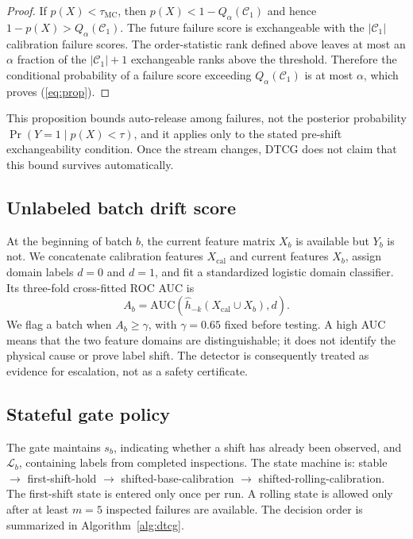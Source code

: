 \documentclass[journal]{IEEEtran}
\begin{document}
\begin{proof}
If $p(X)<\tau_{\mathrm{MC}}$, then $p(X)<1-Q_\alpha(\mathcal{C}_1)$ and hence $1-p(X)>Q_\alpha(\mathcal{C}_1)$. The future failure score is exchangeable with the $|\mathcal{C}_1|$ calibration failure scores. The order-statistic rank defined above leaves at most an $\alpha$ fraction of the $|\mathcal{C}_1|+1$ exchangeable ranks above the threshold. Therefore the conditional probability of a failure score exceeding $Q_\alpha(\mathcal{C}_1)$ is at most $\alpha$, which proves (\ref{eq:prop}).
\end{proof}

This proposition bounds auto-release among failures, not the posterior probability $\Pr(Y=1\mid p(X)<\tau)$, and it applies only to the stated pre-shift exchangeability condition. Once the stream changes, DTCG does not claim that this bound survives automatically.

\subsection{Unlabeled batch drift score}
At the beginning of batch $b$, the current feature matrix $X_b$ is available but $Y_b$ is not. We concatenate calibration features $X_{\mathrm{cal}}$ and current features $X_b$, assign domain labels $d=0$ and $d=1$, and fit a standardized logistic domain classifier. Its three-fold cross-fitted ROC AUC is
\begin{equation}
A_b=\mathrm{AUC}\left(\widehat{h}_{-k}(X_{\mathrm{cal}}\cup X_b),d\right).
\label{eq:auc}
\end{equation}
We flag a batch when $A_b\geq\gamma$, with $\gamma=0.65$ fixed before testing. A high AUC means that the two feature domains are distinguishable; it does not identify the physical cause or prove label shift. The detector is consequently treated as evidence for escalation, not as a safety certificate.

\subsection{Stateful gate policy}
The gate maintains $s_b$, indicating whether a shift has already been observed, and $\mathcal{L}_b$, containing labels from completed inspections. The state machine is: stable $\rightarrow$ first-shift-hold $\rightarrow$ shifted-base-calibration $\rightarrow$ shifted-rolling-calibration. The first-shift state is entered only once per run. A rolling state is allowed only after at least $m=5$ inspected failures are available. The decision order is summarized in Algorithm~\ref{alg:dtcg}.
\end{document}
